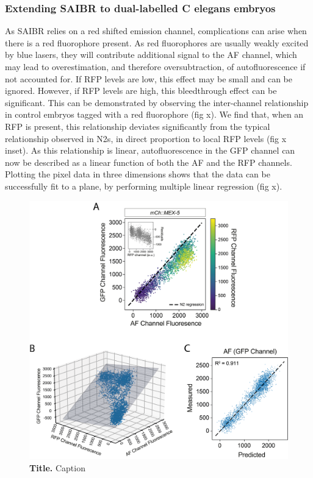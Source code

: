 \documentclass[12pt]{"article"}
\newcommand{\mycaption}[2]{\caption[#1]{\textbf{#1.} #2}}
\begin{document}
\subsubsection{Extending SAIBR to dual-labelled C elegans embryos}

As SAIBR relies on a red shifted emission channel, complications can arise when there is a red fluorophore present. As red fluorophores are usually weakly excited by blue lasers, they will contribute additional signal to the AF channel, which may lead to overestimation, and therefore oversubtraction, of autofluorescence if not accounted for. If RFP levels are low, this effect may be small and can be ignored. However, if RFP levels are high, this bleedthrough effect can be significant. This can be demonstrated by observing the inter-channel relationship in control embryos tagged with a red fluorophore (fig x). We find that, when an RFP is present, this relationship deviates significantly from the typical relationship observed in N2s, in direct proportion to local RFP levels (fig x inset). As this relationship is linear, autofluorescence in the GFP channel can now be described as a linear function of both the AF and the RFP channels. Plotting the pixel data in three dimensions shows that the data can be successfully fit to a plane, by performing multiple linear regression (fig x). \\


\begin{figure}[!h]
\includegraphics[scale=1]{saibr_3channel_correlation}
\setlength{\abovecaptionskip}{20pt}
\centering
\mycaption{Title}{Caption}
\label{fig:saibr_3channel_correlation}
\end{figure}
\end{document}
